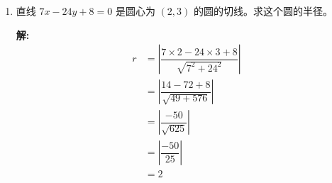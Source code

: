 \documentclass[10pt]{article}
\newcommand{\sol}{\textbf{解:} }
\begin{document}
\begin{enumerate}[leftmargin=*]
        \sol{}
        两圆的方程式相减，得
        \begin{align*}
          6x - 8y - 30 & = 0                   \\
          3x - 4y - 15 & = 0                   \\
          y            & = \dfrac{3}{4}(x - 5)
        \end{align*}
        代入第一个圆的方程式得
        \begin{align*}
          x^{2} + \left(\dfrac{3}{4}(x - 5)\right)^{2} + 2x - 6 \times \dfrac{3}{4}(x - 5) - 26                   & = 0             \\
          x^{2} + \dfrac{9}{16}(x^{2} - 10x + 25) + 2x - \dfrac{9}{2}x + \dfrac{45}{2} - 26                       & = 0             \\
          x^{2} + \dfrac{9}{16}x^{2} - \dfrac{45}{8}x + \dfrac{225}{16} + 2x - \dfrac{9}{2}x + \dfrac{45}{2} - 26 & = 0             \\
          16x^{2} + 9x^{2} - 90x + 225 + 32x - 72x + 360 - 416                                                    & = 0             \\
          25x^{2} - 130x + 169                                                                                    & = 0             \\
          (5x - 13)^{2}                                                                                           & = 0             \\
          x                                                                                                       & = \dfrac{13}{5}
        \end{align*}
        $\because$ 两圆只有一个公共点，所以只有一条公切线。\hfill$\blacksquare$

  \item 直线 $7 x-24 y+8=0$ 是圆心为 $(2,3)$ 的圆的切线。求这个圆的半径。

        \sol{}
        \begin{align*}
          r & = \left\vert \dfrac{7 \times 2 - 24 \times 3 + 8}{\sqrt{7^{2} + 24^{2}}} \right\vert \\
            & = \left\vert \dfrac{14 - 72 + 8}{\sqrt{49 + 576}} \right\vert                        \\
            & = \left\vert \dfrac{-50}{\sqrt{625}} \right\vert                                     \\
            & = \left\vert \dfrac{-50}{25} \right\vert                                             \\
            & = 2
        \end{align*}


\end{enumerate}
\end{document}
